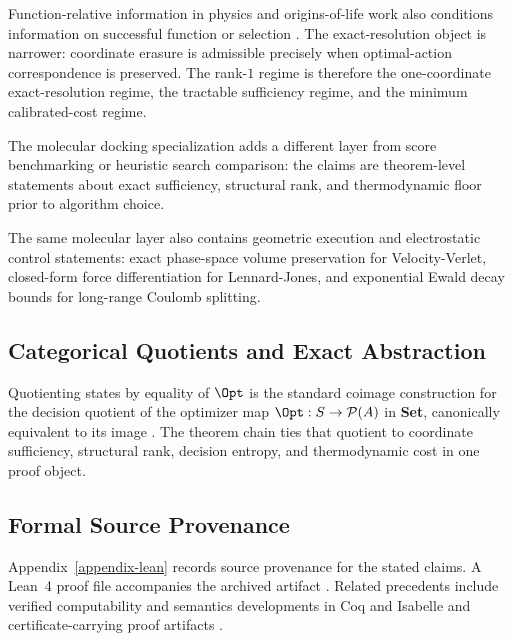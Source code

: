 Function-relative information in physics and origins-of-life work also conditions information on successful function or selection \cite{szostak2003functional,wong2023roles}. The exact-resolution object is narrower: coordinate erasure is admissible precisely when optimal-action correspondence is preserved. The rank-$1$ regime is therefore the one-coordinate exact-resolution regime, the tractable sufficiency regime, and the minimum calibrated-cost regime.

The molecular docking specialization adds a different layer from score benchmarking or heuristic search comparison: the claims are theorem-level statements about exact sufficiency, structural rank, and thermodynamic floor prior to algorithm choice.

The same molecular layer also contains geometric execution and electrostatic control statements: exact phase-space volume preservation for Velocity-Verlet, closed-form force differentiation for Lennard-Jones, and exponential Ewald decay bounds for long-range Coulomb splitting.

\subsection{Categorical Quotients and Exact Abstraction}

Quotienting states by equality of $\Opt$ is the standard coimage construction for the decision quotient of the optimizer map $\Opt : S \to \mathcal{P}(A)$ in \textbf{Set}, canonically equivalent to its image \cite{maclane1998categories}. The theorem chain ties that quotient to coordinate sufficiency, structural rank, decision entropy, and thermodynamic cost in one proof object.

\subsection{Formal Source Provenance}

Appendix~\ref{appendix-lean} records source provenance for the stated claims. A Lean~4 proof file accompanies the archived artifact \cite{moura2021lean4,mathlib2020}. Related precedents include verified computability and semantics developments in Coq and Isabelle \cite{forster2019verified,nipkow2002isabelle,nipkow2014concrete} and certificate-carrying proof artifacts \cite{necula1997proof}.
